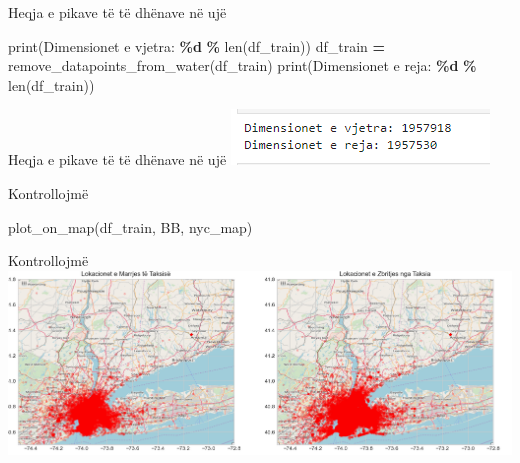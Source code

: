 \documentclass[
  ignorenonframetext,
]{beamer}
\newenvironment{Shaded}{\begin{snugshade}}{\end{snugshade}}
\newcommand{\BuiltInTok}[1]{#1}
\newcommand{\NormalTok}[1]{#1}
\newcommand{\OperatorTok}[1]{\textcolor[rgb]{0.81,0.36,0.00}{\textbf{#1}}}
\newcommand{\SpecialCharTok}[1]{\textcolor[rgb]{0.81,0.36,0.00}{\textbf{#1}}}
\newcommand{\StringTok}[1]{\textcolor[rgb]{0.31,0.60,0.02}{#1}}
\begin{document}
\begin{frame}[fragile]{Heqja e pikave të të dhënave në ujë}
\protect\hypertarget{heqja-e-pikave-tuxeb-tuxeb-dhuxebnave-nuxeb-ujuxeb-11}{}

\begin{Shaded}
\begin{Highlighting}[]
\BuiltInTok{print}\NormalTok{(}\StringTok{\textquotesingle{}Dimensionet e vjetra: }\SpecialCharTok{\%d}\StringTok{\textquotesingle{}} \OperatorTok{\%} \BuiltInTok{len}\NormalTok{(df\_train))}
\NormalTok{df\_train }\OperatorTok{=}\NormalTok{ remove\_datapoints\_from\_water(df\_train)}
\BuiltInTok{print}\NormalTok{(}\StringTok{\textquotesingle{}Dimensionet e reja: }\SpecialCharTok{\%d}\StringTok{\textquotesingle{}} \OperatorTok{\%} \BuiltInTok{len}\NormalTok{(df\_train))}
\end{Highlighting}
\end{Shaded}
\end{frame}

\begin{frame}{Heqja e pikave të të dhënave në ujë}
\protect\hypertarget{heqja-e-pikave-tuxeb-tuxeb-dhuxebnave-nuxeb-ujuxeb-12}{}
\includegraphics{./Figs/train16.png}
\end{frame}

\begin{frame}[fragile]{Kontrollojmë}
\protect\hypertarget{kontrollojmuxeb}{}

\begin{Shaded}
\begin{Highlighting}[]
\NormalTok{plot\_on\_map(df\_train, BB, nyc\_map)}
\end{Highlighting}
\end{Shaded}
\end{frame}

\begin{frame}{Kontrollojmë}
\protect\hypertarget{kontrollojmuxeb-1}{}
\includegraphics{./Figs/train17.png}
\end{frame}
\end{document}
